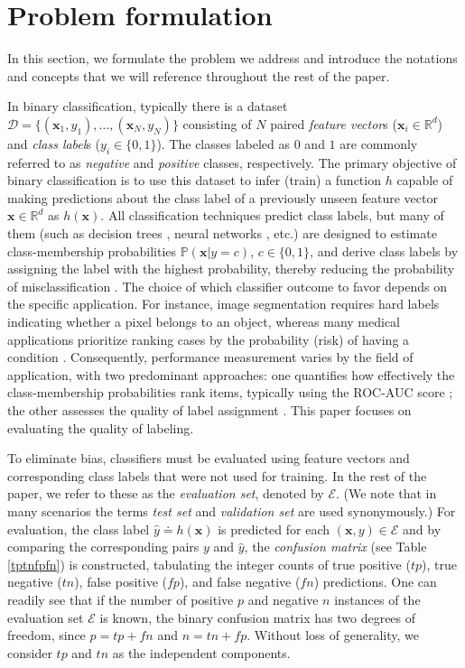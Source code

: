 \documentclass[3p, times]{elsarticle}
\begin{document}
\section{Problem formulation}
\label{sec:problem}

In this section, we formulate the problem we address and introduce the notations and concepts that we will reference throughout the rest of the paper.

In binary classification, typically there is a dataset $\mathcal{D} = \lbrace(\mathbf{x}_1, y_1), \dots, (\mathbf{x}_N, y_N)\rbrace$ consisting of $N$ paired \emph{feature vector}s ($\mathbf{x}_i\in\mathbb{R}^{d}$) and \emph{class label}s ($y_i\in\lbrace 0, 1\rbrace$). The classes labeled as $0$ and $1$ are commonly referred to as \emph{negative} and \emph{positive} classes, respectively.
The primary objective of binary classification is to use this dataset to infer (train) a function $h$ capable of making predictions about the class label of a previously unseen feature vector $\mathbf{x}\in\mathbb{R}^d$ as $h(\mathbf{x})$. All classification techniques predict class labels, but many of them (such as decision trees \cite{mlbook}, neural networks \cite{mlbook}, etc.) are designed to estimate class-membership probabilities $\mathbb{P}(\mathbf{x}|y=c)$, $c\in\lbrace 0, 1\rbrace$, and derive class labels by assigning the label with the highest probability, thereby reducing the probability of misclassification \cite{bayesclassifier}. The choice of which classifier outcome to favor depends on the specific application. For instance, image segmentation \cite{segmentation} requires hard labels indicating whether a pixel belongs to an object, whereas many medical applications prioritize ranking cases by the probability (risk) of having a condition \cite{binclasranking}. Consequently, performance measurement varies by the field of application, with two predominant approaches: one quantifies how effectively the class-membership probabilities rank items, typically using the ROC-AUC score \cite{aucsurvey, auc}; the other assesses the quality of label assignment \cite{scores}. This paper focuses on evaluating the quality of labeling.

To eliminate bias, classifiers must be evaluated using feature vectors and corresponding class labels that were not used for training. In the rest of the paper, we refer to these as the \emph{evaluation set}, denoted by $\mathcal{E}$. (We note that in many scenarios the terms \emph{test set} and \emph{validation set} are used synonymously.) For evaluation, the class label $\hat{y} \doteq h(\mathbf{x})$ is predicted for each $(\mathbf{x}, y)\in\mathcal{E}$ and by comparing the corresponding pairs $y$ and $\hat{y}$, the \emph{confusion matrix} (see Table \ref{tptnfpfn}) is constructed, tabulating the integer counts of true positive ($tp$), true negative ($tn$), false positive ($fp$), and false negative ($fn$) predictions. 
One can readily see that if the number of positive $p$ and negative $n$ instances of the evaluation set $\mathcal{E}$ is known, the binary confusion matrix has two degrees of freedom, since $p = tp + fn$ and $n = tn + fp$. Without loss of generality, we consider $tp$ and $tn$ as the independent components.
\end{document}
